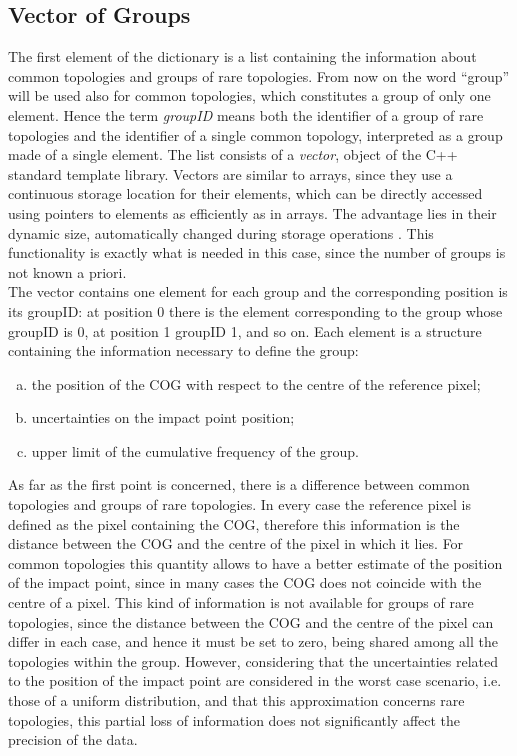 \subsection{Vector of Groups}
The first element of the dictionary is a list containing the information about common topologies and groups of rare topologies. From now on the word ``group'' will be used also for common topologies, which constitutes a group of only one element. Hence the term \textit{groupID} means both the identifier of a group of rare topologies and the identifier of a single common topology, interpreted as a group made of a single element. The list consists of a \textit{vector}, object of the C++ standard template library. Vectors are similar to arrays, since they use a continuous storage location for their elements, which can be directly accessed using pointers to elements as efficiently as in arrays. The advantage lies in their dynamic size, automatically changed during storage operations \cite{vector}. This functionality is exactly what is needed in this case, since the number of groups is not known a priori.\\
The vector contains one element for each group and the corresponding position is its groupID: at position 0 there is the element corresponding to the group whose groupID is 0, at position 1 groupID 1, and so on. Each element is a structure containing the information necessary to define the group:
\begin{enumerate}[a)]
 \item the position of the COG with respect to the centre of the reference pixel;
 \item uncertainties on the impact point position;
 \item upper limit of the cumulative frequency of the group.
\end{enumerate}
As far as the first point is concerned, there is a difference between common topologies and groups of rare topologies. In every case the reference pixel is defined as the pixel containing the COG, therefore this information is the distance between the COG and the centre of the pixel in which it lies. For common topologies this quantity allows to have a better estimate of the position of the impact point, since in many cases the COG does not coincide with the centre of a pixel. This kind of information is not available for groups of rare topologies, since the distance between the COG and the centre of the pixel can differ in each case, and hence it must be set to zero, being shared among all the topologies within the group. However, considering that the uncertainties related to the position of the impact point are considered in the worst case scenario, i.e. those of a uniform distribution, and that this approximation concerns rare topologies, this partial loss of information does not significantly affect the precision of the data.\\
